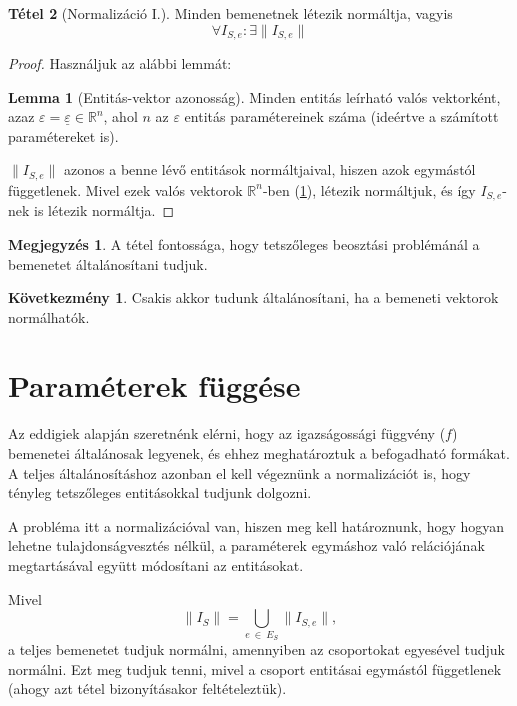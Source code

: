\documentclass{article}
\theoremstyle{definition}
\newtheorem{theorem}{Tétel}[section]
\newtheorem*{kov}{Következmény}
\newtheorem*{megj}{Megjegyzés}
\newtheorem{lemma}[theorem]{Lemma}
\newcommand{\vect}[1]{ \underline{#1} }
\newcommand{\norm}[1]{ \parallel {#1} \parallel }
\begin{document}
\begin{multicols}{2}
    \begin{theorem}[Normalizáció I.]\label{thm:norm1}
        Minden bemenetnek létezik normáltja, vagyis
        \begin{equation}
            \forall I_{S,e} : \exists \norm{I_{S,e}} 
        \end{equation}
        \begin{proof}
        Használjuk az alábbi lemmát:
            \begin{lemma}[Entitás-vektor azonosság]\label{lem:vektor}
                Minden entitás leírható valós vektorként, azaz 
                $\varepsilon = \vect{\varepsilon} \in \mathbb{R}^n$, 
                ahol $n$ az $\varepsilon$ entitás paramétereinek száma (ideértve a számított paramétereket is).
            \end{lemma}
            $\parallel I_{S,e}\parallel $ azonos a benne lévő entitások normáltjaival, hiszen azok egymástól függetlenek. Mivel ezek valós vektorok $\mathbb{R}^n$-ben (\ref{lem:vektor}), létezik normáltjuk, és így $I_{S,e}$-nek is létezik normáltja.
        \end{proof}
        \begin{megj}
            A tétel fontossága, hogy tetszőleges beosztási problémánál a bemenetet általánosítani tudjuk.
        \end{megj}
        \begin{kov}
            Csakis akkor tudunk általánosítani, ha a bemeneti vektorok normálhatók.
        \end{kov}
    \end{theorem}
    
\section{Paraméterek függése}

    Az eddigiek alapján szeretnénk elérni, hogy az igazságossági függvény ($f$) bemenetei általánosak legyenek, és ehhez meghatároztuk a befogadható formákat. A teljes általánosításhoz azonban el kell végeznünk a normalizációt is, hogy tényleg tetszőleges entitásokkal tudjunk dolgozni. 
    
    A probléma itt a normalizációval van, hiszen meg kell határoznunk, hogy hogyan lehetne tulajdonságvesztés nélkül, a paraméterek egymáshoz való relációjának megtartásával együtt módosítani az entitásokat.
    
    Mivel 
    \begin{equation}
        \norm{I_S}  = \bigcup_{e\ \in \ E_S} \norm{I_{S,e}} ,
    \end{equation}
    a teljes bemenetet tudjuk normálni, amennyiben az csoportokat egyesével tudjuk normálni. Ezt meg tudjuk tenni, mivel a csoport entitásai egymástól függetlenek (ahogy azt \az{(\ref{thm:norm1})} tétel bizonyításakor feltételeztük).
    

\end{multicols}
\end{document}
